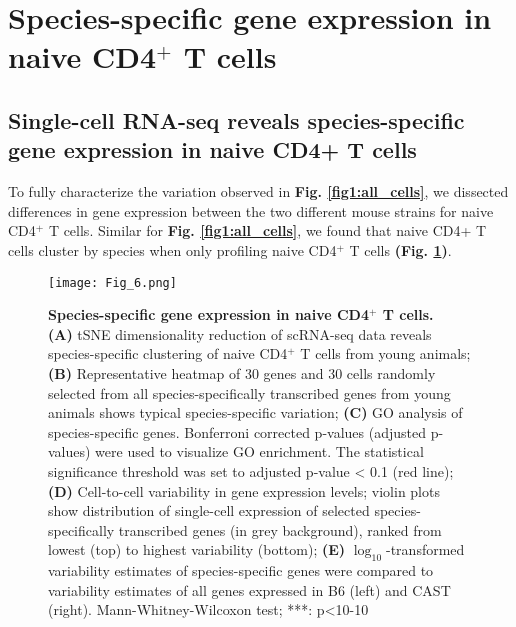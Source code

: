 \section{Species-specific gene expression in naive CD4$^+$ T cells}
\subsection*{Single-cell RNA-seq reveals species-specific gene expression in naive CD4+ T cells}

To fully characterize the variation observed in \textbf{Fig. \ref{fig1:all_cells}}, we dissected differences in gene expression between the two different mouse strains for naive CD4$^+$ T cells. Similar for \textbf{Fig. \ref{fig1:all_cells}}, we found that naive CD4+ T cells cluster by species when only profiling naive CD4$^+$ T cells \textbf{(Fig. \ref{fig1:species_specific})}.

\newpage

\begin{figure}[!hb]
\centering
\texttt{[image: Fig\_6.png]}
\caption[Species-specific gene expression in naive CD4$^+$ T cells]{\textbf{Species-specific gene expression in naive CD4$^+$ T cells.}\\
\textbf{(A)} tSNE dimensionality reduction of scRNA-seq data reveals species-specific clustering of naive CD4$^+$ T cells from young animals; \textbf{(B)} Representative heatmap of 30 genes and 30 cells randomly selected from all species-specifically transcribed genes from young animals shows typical species-specific variation; \textbf{(C)}  GO analysis of species-specific genes. Bonferroni corrected p-values (adjusted p-values) were used to visualize GO enrichment. The statistical significance threshold was set to adjusted p-value < 0.1 (red line); \textbf{(D)} Cell-to-cell variability in gene expression levels; violin plots show distribution of single-cell expression of selected species-specifically transcribed genes (in grey background), ranked from lowest (top) to highest variability (bottom); \textbf{(E)} $\log_10$-transformed variability estimates of species-specific genes were compared to variability estimates of all genes expressed in B6 (left) and CAST (right). Mann-Whitney-Wilcoxon test; ***: p<10-10}
\label{fig1:species_specific}
\end{figure}

